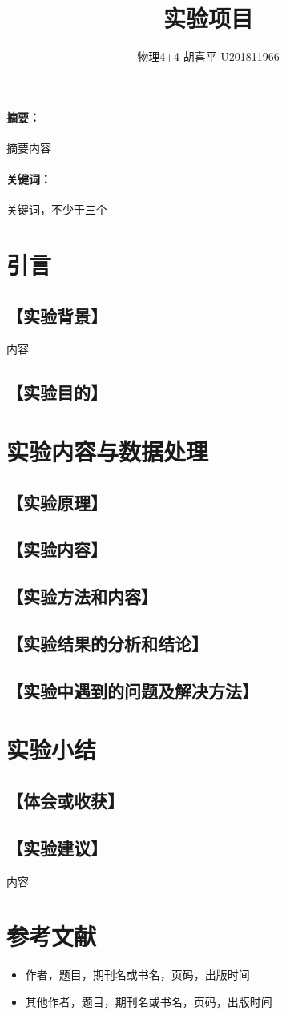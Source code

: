 \documentclass{ctexart}
\date{}
\newcommand{\generatetitle}[4]{\title{\zihao{3}\heiti#1} \author{#2 \quad\quad #3 \quad\quad #4} \maketitle}
\let\oldsubsection\subsection
\renewcommand{\subsection}[1]{\oldsubsection{\!\!\!\!\!\!【#1】}}
\let\oldparagraph\paragraph
\renewcommand{\paragraph}[1]{\oldparagraph{#1：\!\!\!\!\!\!}}
\begin{document}
\generatetitle{实验项目}{物理4+4}{胡喜平}{U201811966}
\paragraph{摘要}
摘要内容
\paragraph{关键词}
关键词，不少于三个
\section{引言}
\subsection{实验背景}
内容
\subsection{实验目的}
\section{实验内容与数据处理}
\subsection{实验原理}
\subsection{实验内容}
\subsection{实验方法和内容}
\subsection{实验结果的分析和结论}
\subsection{实验中遇到的问题及解决方法}
\section{实验小结}
\subsection{体会或收获}
\subsection{实验建议}
内容
\section{参考文献}
\begin{itemize}[leftmargin=0pt]
  \item[] 作者，题目，期刊名或书名，页码，出版时间
  \item[] 其他作者，题目，期刊名或书名，页码，出版时间
\end{itemize}
\end{document}
